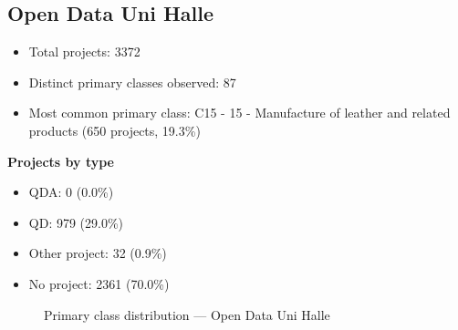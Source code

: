 \subsection{Open Data Uni Halle}

\begin{itemize}
    \item Total projects: 3372
    \item Distinct primary classes observed: 87
    \item Most common primary class: C15 - 15 - Manufacture of leather and related products (650 projects, 19.3\%)
\end{itemize}
\textbf{Projects by type}
\begin{itemize}
    \item QDA: 0 (0.0\%)
    \item QD: 979 (29.0\%)
    \item Other project: 32 (0.9\%)
    \item No project: 2361 (70.0\%)
\end{itemize}

\begin{figure}[H]
    \centering
    
    \caption{Primary class distribution --- Open Data Uni Halle}
\end{figure}

